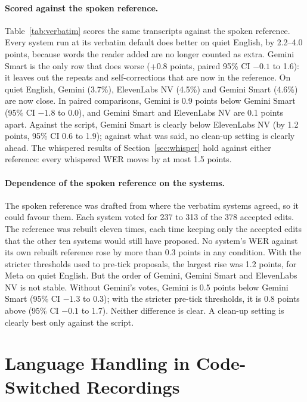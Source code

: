 \documentclass[11pt]{article}
\begin{document}
\paragraph{Scored against the spoken reference.} Table~\ref{tab:verbatim} scores the same transcripts against the spoken reference. Every system run at its verbatim default does better on quiet English, by 2.2--4.0 points, because words the reader added are no longer counted as extra. Gemini Smart is the only row that does worse (+0.8 points, paired 95\% CI $-0.1$ to 1.6): it leaves out the repeats and self-corrections that are now in the reference. On quiet English, Gemini (3.7\%), ElevenLabs NV (4.5\%) and Gemini Smart (4.6\%) are now close. In paired comparisons, Gemini is 0.9 points below Gemini Smart (95\% CI $-1.8$ to 0.0), and Gemini Smart and ElevenLabs NV are 0.1 points apart. Against the script, Gemini Smart is clearly below ElevenLabs NV (by 1.2 points, 95\% CI 0.6 to 1.9); against what was said, no clean-up setting is clearly ahead. The whispered results of Section~\ref{sec:whisper} hold against either reference: every whispered WER moves by at most 1.5 points.

\paragraph{Dependence of the spoken reference on the systems.} The spoken reference was drafted from where the verbatim systems agreed, so it could favour them. Each system voted for 237 to 313 of the 378 accepted edits. The reference was rebuilt eleven times, each time keeping only the accepted edits that the other ten systems would still have proposed. No system's WER against its own rebuilt reference rose by more than 0.3 points in any condition. With the stricter thresholds used to pre-tick proposals, the largest rise was 1.2 points, for Meta on quiet English. But the order of Gemini, Gemini Smart and ElevenLabs NV is not stable. Without Gemini's votes, Gemini is 0.5 points below Gemini Smart (95\% CI $-1.3$ to 0.3); with the stricter pre-tick thresholds, it is 0.8 points above (95\% CI $-0.1$ to 1.7). Neither difference is clear. A clean-up setting is clearly best only against the script.


\FloatBarrier
\section{Language Handling in Code-Switched Recordings}\label{sec:cs}
\end{document}
